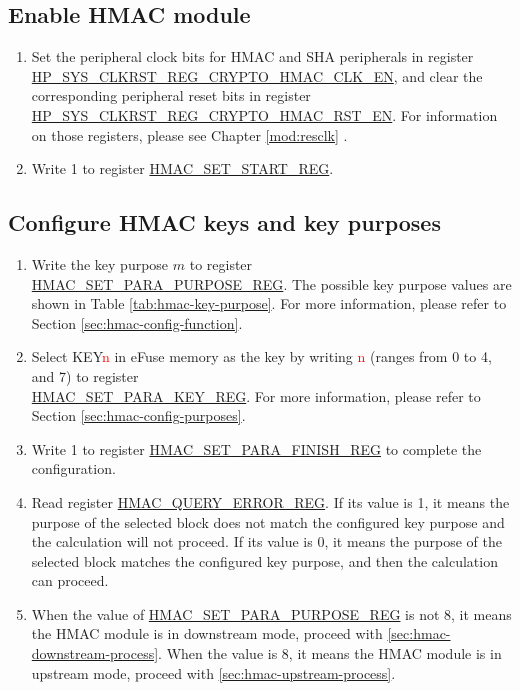 \documentclass[main\_\_EN.tex]{subfiles}
\begin{document}
\subsection{Enable HMAC module}
\label{sec:hmac-enable-module}

    \begin{enumerate}
        \item Set the peripheral clock bits for HMAC and SHA peripherals in register \hyperref[fielddesc:HPSYSCLKRSTREGCRYPTOHMACCLKEN]{HP\_SYS\_CLKRST\_REG\_CRYPTO\_HMAC\_CLK\_EN}, and clear the corresponding peripheral reset bits in register \hyperref[fielddesc:HPSYSCLKRSTREGCRYPTOHMACRSTEN]{HP\_SYS\_CLKRST\_REG\_CRYPTO\_HMAC\_RST\_EN}. For information on those registers, please see Chapter \ref{mod:resclk} \textit{}.
        \item Write 1 to register \hyperref[regdesc:HMACSETSTARTREG]{HMAC\_SET\_START\_REG}.
    \end{enumerate}

\subsection{Configure HMAC keys and key purposes}

    \begin{enumerate}
        \item Write the key purpose \begin{math}m\end{math} to register \hyperref[regdesc:HMACSETPARAPURPOSEREG]{HMAC\_SET\_PARA\_PURPOSE\_REG}. The possible key purpose values are shown in Table \ref{tab:hmac-key-purpose}. For more information, please refer to Section \ref{sec:hmac-config-function}.
        \item Select KEY\textcolor{red}{n} in eFuse memory as the key by writing \textcolor{red}{n} (ranges from 0 to 4, and 7) to register\\ \hyperref[regdesc:HMACSETPARAKEYREG]{HMAC\_SET\_PARA\_KEY\_REG}. For more information, please refer to Section \ref{sec:hmac-config-purposes}.
        \item Write 1 to register \hyperref[regdesc:HMACSETPARAFINISHREG]{HMAC\_SET\_PARA\_FINISH\_REG} to complete the configuration.
        \item Read register \hyperref[regdesc:HMACQUERYERRORREG]{HMAC\_QUERY\_ERROR\_REG}. If its value is 1, it means the purpose of the selected block does not match the configured key purpose and the calculation will not proceed. If its value is 0, it means the purpose of the selected block matches the configured key purpose, and then the calculation can proceed.
        \item When the value of \hyperref[regdesc:HMACSETPARAPURPOSEREG]{HMAC\_SET\_PARA\_PURPOSE\_REG} is not 8, it means the HMAC module is in downstream mode, proceed with \ref{sec:hmac-downstream-process}. When the value is 8, it means the HMAC module is in upstream mode, proceed with \ref{sec:hmac-upstream-process}.
    \end{enumerate}
\end{document}
